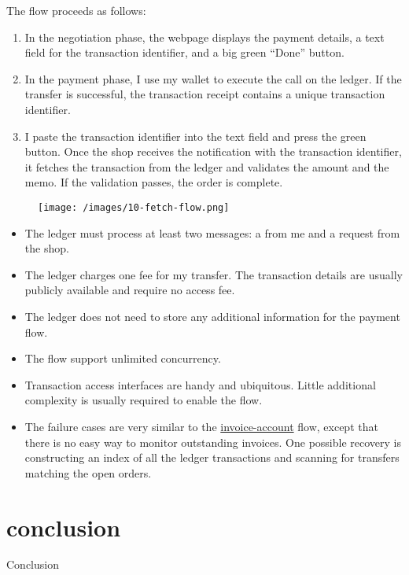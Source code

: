 \documentclass{article}
\begin{document}
The flow proceeds as follows:
\begin{enumerate}
  \item In the negotiation phase, the webpage displays the payment details, a text field for the transaction identifier, and a big green ``Done'' button.
  \item 
    In the payment phase, I use my wallet to execute the  call on the ledger.
    If the transfer is successful, the transaction receipt contains a unique transaction identifier.
  \item 
    I paste the transaction identifier into the text field and press the green button.
    Once the shop receives the notification with the transaction identifier, it fetches the transaction from the ledger and validates the amount and the memo.
    If the validation passes, the order is complete.
\end{enumerate}

\begin{figure}[grayscale-diagram]
\texttt{[image: /images/10-fetch-flow.png]}
\end{figure}

\begin{itemize}
  \item The ledger must process at least two messages: a  from me and a  request from the shop.
  \item 
    The ledger charges one fee for my transfer.
    The transaction details are usually publicly available and require no access fee.
  \item The ledger does not need to store any additional information for the payment flow.
  \item The flow support unlimited concurrency.
  \item 
    Transaction access interfaces are handy and ubiquitous.
    Little additional complexity is usually required to enable the flow.
  \item 
    The failure cases are very similar to the \href{#invoice-account}{invoice-account} flow, except that there is no easy way to monitor outstanding invoices.
    One possible recovery is constructing an index of all the ledger transactions and scanning for transfers matching the open orders.
\end{itemize}

\section{conclusion}{Conclusion}
\end{document}
